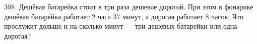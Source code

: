 308. Дешёвая батарейка стоит в три раза дешевле дорогой. При этом в фонарике дешёвая батарейка работает 2 часа 37 минут, а дорогая работает 8 часов. Что прослужит дольше и на сколько минут --- три дешёвых батарейки или одна дорогая?\\
